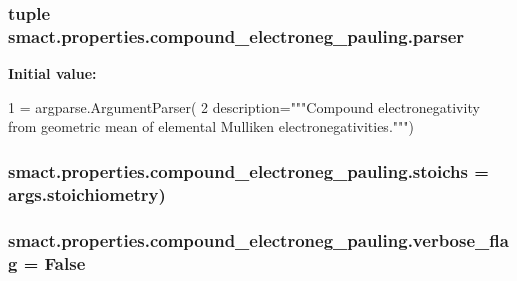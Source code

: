 \subsubsection[{parser}]{\setlength{\rightskip}{0pt plus 5cm}tuple smact.\+properties.\+compound\+\_\+electroneg\+\_\+pauling.\+parser}\label{namespacesmact_1_1properties_1_1compound__electroneg__pauling_a1f1c8773c760e27a71b2f2447a812b3c}
{\bfseries Initial value\+:}
\begin{DoxyCode}
1 = argparse.ArgumentParser(
2         description=\textcolor{stringliteral}{"""Compound electronegativity from geometric mean of                       elemental
       Mulliken electronegativities."""})
\end{DoxyCode}
\hypertarget{namespacesmact_1_1properties_1_1compound__electroneg__pauling_a582e6cce9e104f4732a1b169652dbdd4}{}
\subsubsection[{stoichs}]{\setlength{\rightskip}{0pt plus 5cm}smact.\+properties.\+compound\+\_\+electroneg\+\_\+pauling.\+stoichs = args.\+stoichiometry)}\label{namespacesmact_1_1properties_1_1compound__electroneg__pauling_a582e6cce9e104f4732a1b169652dbdd4}
\hypertarget{namespacesmact_1_1properties_1_1compound__electroneg__pauling_a396461def50d33825a424b7d8885a84d}{}
\subsubsection[{verbose\+\_\+flag}]{\setlength{\rightskip}{0pt plus 5cm}smact.\+properties.\+compound\+\_\+electroneg\+\_\+pauling.\+verbose\+\_\+flag = False}\label{namespacesmact_1_1properties_1_1compound__electroneg__pauling_a396461def50d33825a424b7d8885a84d}
